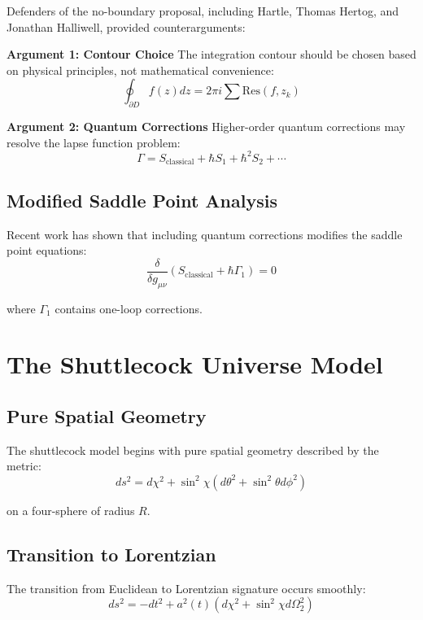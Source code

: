 \documentclass[12pt,a4paper]{article}
\begin{document}
Defenders of the no-boundary proposal, including Hartle, Thomas Hertog, and Jonathan Halliwell, provided counterarguments:

\textbf{Argument 1: Contour Choice}
The integration contour should be chosen based on physical principles, not mathematical convenience:
\begin{equation}
\oint_{\partial D} f(z)dz = 2\pi i \sum \text{Res}(f,z_k)
\end{equation}

\textbf{Argument 2: Quantum Corrections}
Higher-order quantum corrections may resolve the lapse function problem:
\begin{equation}
\Gamma = S_{\text{classical}} + \hbar S_1 + \hbar^2 S_2 + \cdots
\end{equation}

\subsection{Modified Saddle Point Analysis}

Recent work has shown that including quantum corrections modifies the saddle point equations:
\begin{equation}
\frac{\delta}{\delta g_{\mu\nu}}\left(S_{\text{classical}} + \hbar \Gamma_1\right) = 0
\end{equation}

where $\Gamma_1$ contains one-loop corrections.

\section{The Shuttlecock Universe Model}

\subsection{Pure Spatial Geometry}

The shuttlecock model begins with pure spatial geometry described by the metric:
\begin{equation}
ds^2 = d\chi^2 + \sin^2\chi(d\theta^2 + \sin^2\theta d\phi^2)
\end{equation}

on a four-sphere of radius $R$.

\subsection{Transition to Lorentzian}

The transition from Euclidean to Lorentzian signature occurs smoothly:
\begin{equation}
ds^2 = -dt^2 + a^2(t)(d\chi^2 + \sin^2\chi d\Omega_2^2)
\end{equation}
\end{document}
